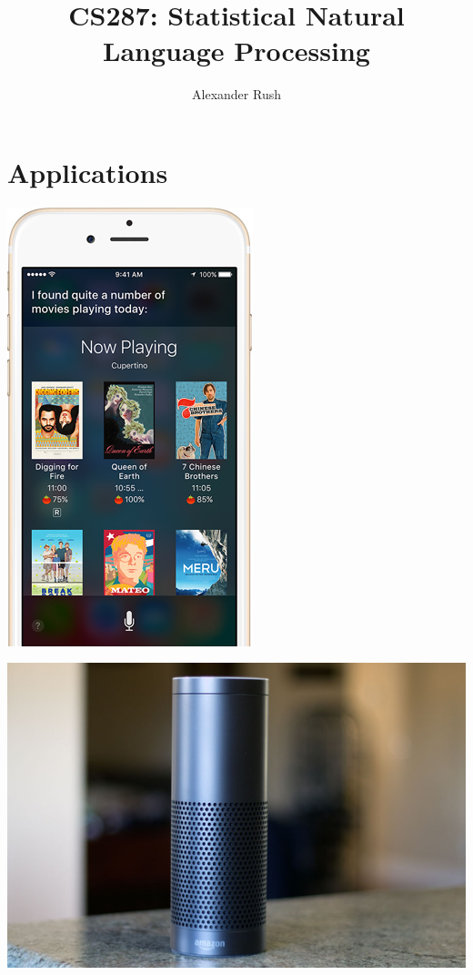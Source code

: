 \documentclass{beamer}
\title{CS287: Statistical Natural Language Processing}
\author{Alexander Rush}
\newenvironment{changemargin}{%
\begin{list}{}{%
\vspace{-1cm}
\setlength{\topsep}{0pt}%
\setlength{\leftmargin}{-1cm}%
\setlength{\rightmargin}{-1cm}%
\setlength{\listparindent}{\parindent}%
\setlength{\itemindent}{\parindent}%
\setlength{\parsep}{\parskip}%
}%
\item[]}{\end{list}}
\begin{document}
\begin{frame}
  \titlepage
\end{frame}

\section{Applications}

{

}

\begin{frame}
  \begin{center}
    \includegraphics{siri}
  \end{center}
\end{frame}

\begin{frame}
  \begin{changemargin}
  \begin{center}
    \includegraphics[height=1.1\textheight]{echo}
  \end{center}
  \end{changemargin}
\end{frame}
\end{document}

